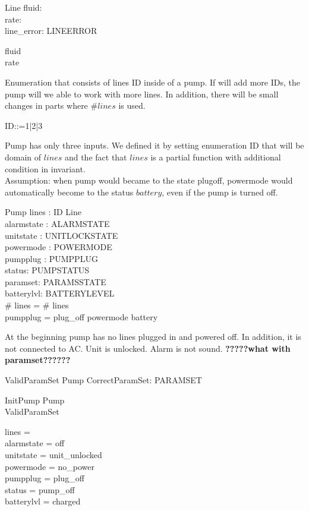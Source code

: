 \documentclass{article}
\begin{document}
	\begin{schema}{Line}
		fluid: \nat \\
		rate: \nat \\
		line\_error: LINEERROR
	\where

	
		fluid  \\ 
		rate 
	\end{schema}
	
	Enumeration that consists of lines ID inside of a pump. If will add more IDs, the pump will we able to work with more lines. In addition, there will be small changes in parts where $\# lines$ is used.
	\begin{zed}
		ID::=1|2|3
	\end{zed}
	
	Pump has only three inputs. We defined it by setting enumeration ID that will be domain of $lines$ and the fact that $lines$ is a partial function with additional condition in invariant.\\
		Assumption: when pump would became to the state plugoff, powermode would automatically become to the status $battery$, even if the pump is turned off. 
	

	\begin{schema}{Pump}
		lines : ID \pfun Line \\
		alarmstate : ALARMSTATE \\
		unitstate : UNITLOCKSTATE \\
		powermode : POWERMODE \\
		pumpplug : PUMPPLUG \\
		status: PUMPSTATUS \\
		paramset: PARAMSSTATE \\
		batterylvl: BATTERYLEVEL\\
		
	\where
		\# \ran lines = \# \dom lines \\
		pumpplug = plug\_off \implies powermode \neq battery 
	\end{schema}
	
	
	At the beginning pump has no lines plugged in and powered off. In addition, it is not connected to AC. Unit is unlocked. Alarm is not sound. 
	\textbf{?????what with paramset??????}
		
			\begin{schema}{ValidParamSet}
				Pump
			CorrectParamSet: \power PARAMSET
				
			\end{schema}
		
	
	\begin{schema}{InitPump}
		Pump\\
		ValidParamSet
		
		\where
		lines = \emptyset \\
		alarmstate = off \\
		unitstate  = unit\_unlocked \\
		powermode =  no\_power \\
		pumpplug = plug\_off \\
		status = pump\_off \\	
		batterylvl = charged\\
	\end{schema}
	
\end{document}
